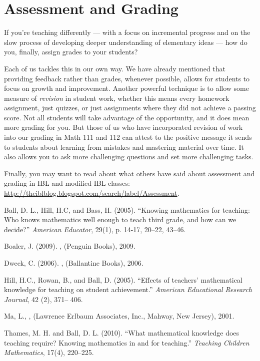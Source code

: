 \documentclass[12pt, reqno]{amsart}
\theoremstyle{remark}
\theoremstyle{definition}
\numberwithin{equation}{section}  %
\begin{document}
\section{Assessment and Grading}
If you're teaching differently --- with a focus on incremental progress and on the slow process of developing deeper understanding of elementary ideas --- how do you, finally, assign grades to your students?  

Each of us tackles this in our own way.  We have already mentioned that providing feedback rather than grades, whenever possible, allows for students to focus on growth and improvement.  Another powerful technique is to allow some measure of \emph{revision} in student work, whether this means every homework assignment, just quizzes, or just assignments where they did not achieve a passing score.  Not all students will take advantage of the opportunity, and it does mean more grading for you.  But those of us who have incorporated revision of work into our grading in Math 111 and 112 can attest to the positive message it sends to students about learning from mistakes and mastering material over time.  It also allows you to ask more challenging questions and set more challenging tasks.

Finally, you may want to read about what others have said about assessment and grading in IBL and modified-IBL classes: \url{http://theiblblog.blogspot.com/search/label/Assessment}.



\begin{thebibliography}{10}


Ball, D. L., Hill, H.C, and  Bass, H. (2005). ``Knowing mathematics for teaching: Who knows mathematics well enough to teach third grade, and how can we decide?'' \emph{American Educator}, 29(1), p. 14-17, 20--22, 43--46.


Boaler, J. (2009).  , 
\newblock (Penguin Books), 2009.


Dweck, C. (2006).  , 
\newblock (Ballantine Books), 2006.

Hill, H.C., Rowan, B., and  Ball, D. (2005).  ``Effects of teachers' mathematical knowledge for teaching on student achievement.''  \emph{American Educational Research Journal}, 42 (2), 371-- 406.

Ma, L.,
,
\newblock (Lawrence Erlbaum Associates, Inc., Mahway, New Jersey), 2001.


Thames, M. H. and Ball, D. L. (2010). ``What mathematical knowledge does teaching require? Knowing mathematics in and for teaching.'' \emph{Teaching Children Mathematics}, 17(4), 220--225.


\end{thebibliography}
\end{document}
